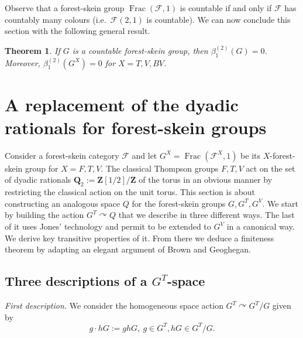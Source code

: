 \documentclass[a4paper, 12pt]{amsart}
\numberwithin{equation}{section}
\newtheorem{theorem}{Theorem}[section]
\theoremstyle{definition}
\newcommand{\act}{\curvearrowright}
\newcommand{\betti}{\beta^{(2)}_1}
\newcommand{\cF}{\mathcal F}
\DeclareMathOperator{\Frac}{Frac}
\newcommand{\Q}{\mathbf{Q}}
\newcommand{\Z}{\mathbf{Z}}
\begin{document}
Observe that a forest-skein group $\Frac(\cF,1)$ is countable if and only if $\cF$ has countably many colours (i.e.~$\cF(2,1)$ is countable).
We can now conclude this section with the following general result.

\begin{theorem}\label{theo:Betti}
If $G$ is a countable forest-skein group, then $\betti(G)=0$. 
Moreover, $\betti(G^X)=0$ for $X=T,V,BV$.
\end{theorem}









\section{A replacement of the dyadic rationals for forest-skein groups}\label{sec:Q-space}

Consider a forest-skein category $\cF$ and let $G^X=\Frac(\cF^X,1)$ be its $X$-forest-skein group for $X=F,T,V$.
The classical Thompson groups $F,T,V$ act on the set of dyadic rationals $\Q_2:=\Z[1/2]/\Z$ of the torus in an obvious manner by restricting the classical action on the unit torus. 
This section is about constructing an analogous space $Q$ for the forest-skein groups $G,G^T,G^V$. 
We start by building the action $G^T\act Q$ that we describe in three different ways. 
The last of it uses Jones' technology and permit to be extended to $G^V$ in a canonical way.
We derive key transitive properties of it. 
From there we deduce a finiteness theorem by adapting an elegant argument of Brown and Geoghegan.

\subsection{Three descriptions of a $G^T$-space}

{\it First description.} We consider the homogeneous space action $G^T\act G^T/G$ given by $$g\cdot hG:=ghG,\ g\in G^T, hG\in G^T/G.$$
\end{document}
